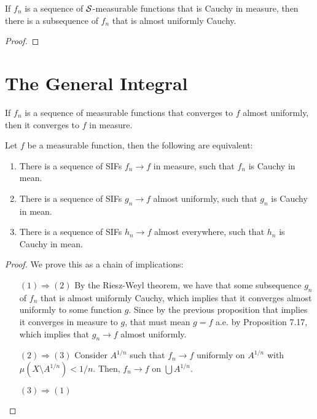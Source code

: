 \begin{theorem}
    If $f_n$ is a sequence of $\mathcal S$-measurable functions that is Cauchy in measure, then there is a subsequence of $f_n$ that is almost uniformly Cauchy.
\end{theorem}

\begin{proof}
    
\end{proof}

\section{The General Integral}

\begin{proposition}
    If $f_n$ is a sequence of measurable functions that converges to $f$ almost uniformly, then it converges to $f$ in measure.
\end{proposition}

\begin{theorem}
    Let $f$ be a measurable function, then the following are equivalent:
    \begin{enumerate}
        \item There is a sequence of SIFs $f_n \to f$ in measure, such that $f_n$ is Cauchy in mean.
        \item There is a sequence of SIFs $g_n \to f$ almost uniformly, such that $g_n$ is Cauchy in mean.
        \item There is a sequence of SIFs $h_n \to f$ almost everywhere, such that $h_n$ is Cauchy in mean.
    \end{enumerate}
\end{theorem}

\begin{proof}
    We prove this as a chain of implications:
    \begin{enumerate}
        \item[$(1) \Rightarrow (2)$] By the Riesz-Weyl theorem, we have that some subsequence $g_n$ of $f_n$ that is almost uniformly Cauchy, which implies that  it converges almost uniformly to some function $g$. Since by the previous proposition that implies it converges in measure to $g$, that must mean $g = f$ a.e. by Proposition 7.17, which implies that $g_n \to f$ almost uniformly.
        \item[$(2) \Rightarrow (3)$] Consider $A^{1/n}$ such that $f_n \to f$ uniformly on $A^{1/n}$ with $\mu(X \setminus A^{1/n}) < 1/n$. Then, $f_n \to f$ on $\bigcup A^{1/n}$.
        \item[$(3) \Rightarrow (1)$]    
    \end{enumerate}
\end{proof}


